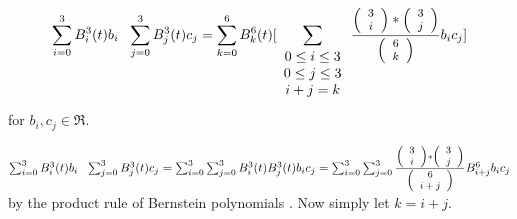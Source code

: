 \begin{lemma}
\label{lem:product}
\begin{equation}
\sum_{i=0}^{3} B_i^3(t) b_i \ \ \sum_{j=0}^{3} B_j^3(t) c_j
= \sum_{k=0}^{6} B_k^6(t) [\sum_{\begin{array}{c} 0 \leq i \leq 3 \\ 
			     0 \leq j \leq 3 \\ 
			     i+j=k
			     \end{array}}
	\frac{\mbox{\footnotesize{$\left( \begin{array}{c} 3 \\ i \end{array} \right)$}} * \mbox{\footnotesize{$\left( \begin{array}{c} 3 \\ j \end{array} \right)$}}}{\mbox{\footnotesize{$\left( \begin{array}{c} 6 \\ k \end{array} \right)$}}}  b_i c_j ]
\end{equation}
for $b_i,c_j \in \Re$.
\end{lemma}
\prf
$\sum_{i=0}^{3} B_i^3(t) b_i \ \ \sum_{j=0}^{3} B_j^3(t) c_j
= \sum_{i=0}^{3} \sum_{j=0}^{3} B_i^3(t) B_j^3(t) b_i c_j
= \sum_{i=0}^{3} \sum_{j=0}^{3} 
	\frac{\choice{3}{i}*\choice{3}{j}}{\choice{6}{i+j}}
	B_{i+j}^6 b_i c_j$
by the product rule of Bernstein polynomials \cite{farin93}.
Now simply let $k=i+j$.
\QED
\fi %



